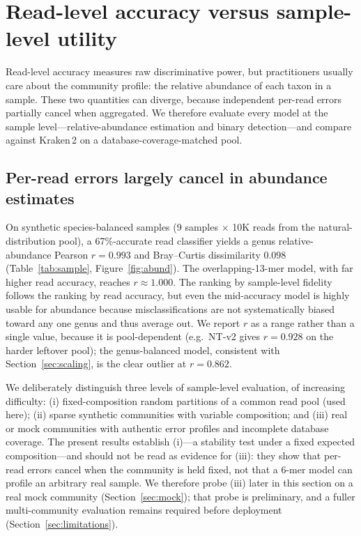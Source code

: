 \section{Read-level accuracy versus sample-level utility}
\label{sec:sample}

Read-level accuracy measures raw discriminative power, but practitioners
usually care about the community profile: the relative abundance of each taxon
in a sample. These two quantities can diverge, because independent per-read
errors partially cancel when aggregated. We therefore evaluate every model at
the sample level---relative-abundance estimation and binary detection---and
compare against Kraken\,2 on a database-coverage-matched pool.

\subsection{Per-read errors largely cancel in abundance estimates}

On synthetic species-balanced samples (9 samples $\times$ 10K reads from the
natural-distribution pool), a 67\%-accurate read classifier yields a
genus relative-abundance Pearson $r=0.993$ and Bray--Curtis dissimilarity
$0.098$ (Table~\ref{tab:sample}, Figure~\ref{fig:abund}). The overlapping-13-mer
model, with far higher read accuracy, reaches $r\!\approx\!1.000$. The ranking
by sample-level fidelity follows the ranking by read accuracy, but even the
mid-accuracy model is highly usable for abundance because misclassifications
are not systematically biased toward any one genus and thus average out. We
report $r$ as a range rather than a single value, because it is pool-dependent
(e.g.\ NT-v2 gives $r=0.928$ on the harder leftover pool); the genus-balanced
model, consistent with Section~\ref{sec:scaling}, is the clear outlier at
$r=0.862$.

We deliberately distinguish three levels of sample-level evaluation, of
increasing difficulty: (i) fixed-composition random partitions of a common read
pool (used here); (ii) sparse synthetic communities with variable composition;
and (iii) real or mock communities with authentic error profiles and incomplete
database coverage. The present results establish (i)---a stability test under a
fixed expected composition---and should not be read as evidence for (iii): they
show that per-read errors cancel when the community is held fixed, not that a
6-mer model can profile an arbitrary real sample. We therefore probe (iii) later
in this section on a real mock community (Section~\ref{sec:mock}); that probe is
preliminary, and a fuller multi-community evaluation remains required before
deployment (Section~\ref{sec:limitations}).

